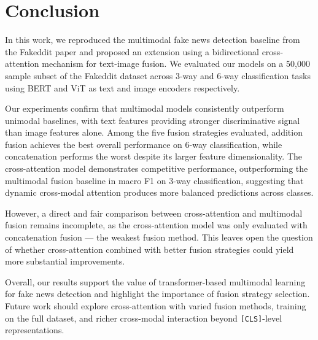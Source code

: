 \section{Conclusion}

In this work, we reproduced the multimodal fake news detection baseline from the Fakeddit paper and proposed an extension using a bidirectional cross-attention mechanism for text-image fusion. We evaluated our models on a 50,000 sample subset of the Fakeddit dataset across 3-way and 6-way classification tasks using BERT and ViT as text and image encoders respectively.

Our experiments confirm that multimodal models consistently outperform unimodal baselines, with text features providing stronger discriminative signal than image features alone. Among the five fusion strategies evaluated, addition fusion achieves the best overall performance on 6-way classification, while concatenation performs the worst despite its larger feature dimensionality. The cross-attention model demonstrates competitive performance, outperforming the multimodal fusion baseline in macro F1 on 3-way classification, suggesting that dynamic cross-modal attention produces more balanced predictions across classes.

However, a direct and fair comparison between cross-attention and multimodal fusion remains incomplete, as the cross-attention model was only evaluated with concatenation fusion — the weakest fusion method. This leaves open the question of whether cross-attention combined with better fusion strategies could yield more substantial improvements.

Overall, our results support the value of transformer-based multimodal learning for fake news detection and highlight the importance of fusion strategy selection. Future work should explore cross-attention with varied fusion methods, training on the full dataset, and richer cross-modal interaction beyond \texttt{[CLS]}-level representations.